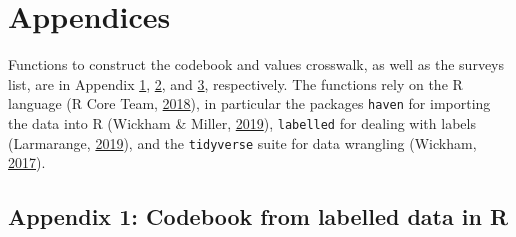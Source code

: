 \documentclass[12pt,]{article}
\begin{document}
\clearpage

\hypertarget{appendices}{%
\section{Appendices}\label{appendices}}

Functions to construct the codebook and values crosswalk, as well as the surveys list, are in Appendix \protect\hyperlink{appendix1}{1}, \protect\hyperlink{appendix2}{2}, and \protect\hyperlink{appendix3}{3}, respectively. The functions rely on the R language (R Core Team, \protect\hyperlink{ref-baser}{2018}), in particular the packages \texttt{haven} for importing the data into R (Wickham \& Miller, \protect\hyperlink{ref-haven}{2019}), \texttt{labelled} for dealing with labels (Larmarange, \protect\hyperlink{ref-labelled}{2019}), and the \texttt{tidyverse} suite for data wrangling (Wickham, \protect\hyperlink{ref-tidyverse}{2017}).

\hypertarget{appendix1}{%
\subsection{Appendix 1: Codebook from labelled data in R}\label{appendix1}}

\scriptsize
\end{document}
